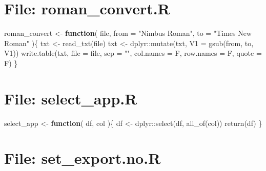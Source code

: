 \documentclass[
]{article}
\newenvironment{Shaded}{\begin{snugshade}}{\end{snugshade}}
\newcommand{\AttributeTok}[1]{\textcolor[rgb]{0.77,0.63,0.00}{#1}}
\newcommand{\ControlFlowTok}[1]{\textcolor[rgb]{0.13,0.29,0.53}{\textbf{#1}}}
\newcommand{\FunctionTok}[1]{\textcolor[rgb]{0.00,0.00,0.00}{#1}}
\newcommand{\NormalTok}[1]{#1}
\newcommand{\OtherTok}[1]{\textcolor[rgb]{0.56,0.35,0.01}{#1}}
\newcommand{\SpecialCharTok}[1]{\textcolor[rgb]{0.00,0.00,0.00}{#1}}
\newcommand{\StringTok}[1]{\textcolor[rgb]{0.31,0.60,0.02}{#1}}
\begin{document}
\hypertarget{file-roman_convert.r}{%
\section{File: roman\_convert.R}\label{file-roman_convert.r}}

\begin{Shaded}
\begin{Highlighting}[]
\NormalTok{roman\_convert }\OtherTok{\textless{}{-}} 
  \ControlFlowTok{function}\NormalTok{(}
\NormalTok{           file,}
           \AttributeTok{from =} \StringTok{"Nimbus Roman"}\NormalTok{,}
           \AttributeTok{to =} \StringTok{"Times New Roman"}
\NormalTok{           )\{}
\NormalTok{    txt }\OtherTok{\textless{}{-}} \FunctionTok{read\_txt}\NormalTok{(file)}
\NormalTok{    txt }\OtherTok{\textless{}{-}}\NormalTok{ dplyr}\SpecialCharTok{::}\FunctionTok{mutate}\NormalTok{(txt, }\AttributeTok{V1 =} \FunctionTok{gsub}\NormalTok{(from, to, V1))}
    \FunctionTok{write.table}\NormalTok{(txt, }\AttributeTok{file =}\NormalTok{ file, }\AttributeTok{sep =} \StringTok{""}\NormalTok{, }\AttributeTok{col.names =}\NormalTok{ F, }\AttributeTok{row.names =}\NormalTok{ F, }\AttributeTok{quote =}\NormalTok{ F)}
\NormalTok{  \}}
\end{Highlighting}
\end{Shaded}

\hypertarget{file-select_app.r}{%
\section{File: select\_app.R}\label{file-select_app.r}}

\begin{Shaded}
\begin{Highlighting}[]
\NormalTok{select\_app }\OtherTok{\textless{}{-}} 
  \ControlFlowTok{function}\NormalTok{(}
\NormalTok{           df,}
\NormalTok{           col}
\NormalTok{           )\{}
\NormalTok{    df }\OtherTok{\textless{}{-}}\NormalTok{ dplyr}\SpecialCharTok{::}\FunctionTok{select}\NormalTok{(df, }\FunctionTok{all\_of}\NormalTok{(col))}
    \FunctionTok{return}\NormalTok{(df)}
\NormalTok{  \}}
\end{Highlighting}
\end{Shaded}

\hypertarget{file-set_export.no.r}{%
\section{File: set\_export.no.R}\label{file-set_export.no.r}}
\end{document}

